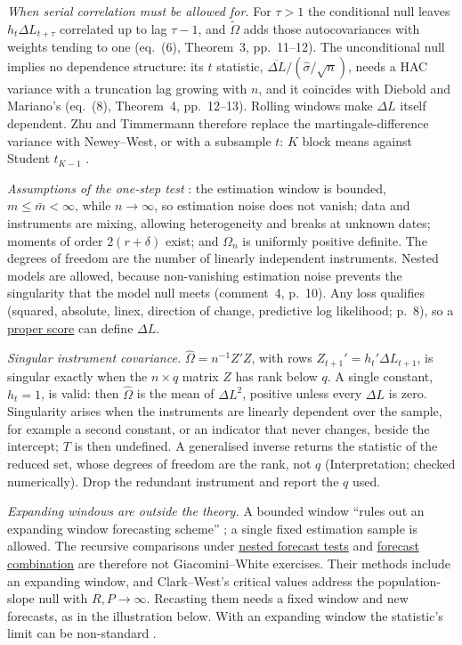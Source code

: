 \begin{qfmethod}
\emph{When serial correlation must be allowed for.} For $\tau>1$ the conditional null leaves $h_t\Delta L_{t+\tau}$ correlated up to lag $\tau-1$, and $\tilde\Omega$ adds those autocovariances with weights tending to one (eq.~(6), Theorem~3, pp.~11--12). The unconditional null implies no dependence structure: its $t$ statistic, $\overline{\Delta L}/(\hat\sigma/\sqrt n)$, needs a HAC variance with a truncation lag growing with $n$, and it coincides with Diebold and Mariano's (eq.~(8), Theorem~4, pp.~12--13). Rolling windows make $\Delta L$ itself dependent. Zhu and Timmermann therefore replace the martingale-difference variance with Newey--West, or with a subsample $t$: $K$ block means against Student $t_{K-1}$ \citep[arXiv:2006.03238v2, Remarks~1--2 and eq.~(13), p.~14]{zhu-timmermann-2022-arxiv}.

 \emph{Assumptions of the one-step test} \citep[Theorem~1, p.~9]{giacomini-white-2006-wp}: the estimation window is bounded, $m\le\bar m<\infty$, while $n\to\infty$, so estimation noise does not vanish; data and instruments are mixing, allowing heterogeneity and breaks at unknown dates; moments of order $2(r+\delta)$ exist; and $\Omega_n$ is uniformly positive definite. The degrees of freedom are the number of linearly independent instruments. Nested models are allowed, because non-vanishing estimation noise prevents the singularity that the model null meets (comment~4, p.~10). Any loss qualifies (squared, absolute, linex, direction of change, predictive log likelihood; p.~8), so a \hyperref[meth:proper-scoring-rules]{proper score} can define $\Delta L$.

\emph{Singular instrument covariance.} $\hat\Omega=n^{-1}Z'Z$, with rows $Z_{t+1}'=h_t'\Delta L_{t+1}$, is singular exactly when the $n\times q$ matrix $Z$ has rank below $q$. A single constant, $h_t=1$, is valid: then $\hat\Omega$ is the mean of $\Delta L^2$, positive unless every $\Delta L$ is zero. Singularity arises when the instruments are linearly dependent over the sample, for example a second constant, or an indicator that never changes, beside the intercept; $T$ is then undefined. A generalised inverse returns the statistic of the reduced set, whose degrees of freedom are the rank, not $q$ (Interpretation; checked numerically). Drop the redundant instrument and report the $q$ used.

\emph{Expanding windows are outside the theory.} A bounded window ``rules out an expanding window forecasting scheme'' \citep[p.~8 and comment~3, p.~10]{giacomini-white-2006-wp}; a single fixed estimation sample is allowed. The recursive comparisons under \hyperref[meth:nested-forecast-tests]{nested forecast tests} and \hyperref[meth:forecast-combination]{forecast combination} are therefore not Giacomini--White exercises. Their methods include an expanding window, and Clark--West's critical values address the population-slope null with $R,P\to\infty$. Recasting them needs a fixed window and new forecasts, as in the illustration below. With an expanding window the statistic's limit can be non-standard \citep[Proposition~8, p.~17]{zhu-timmermann-2022-arxiv}.


\end{qfmethod}
